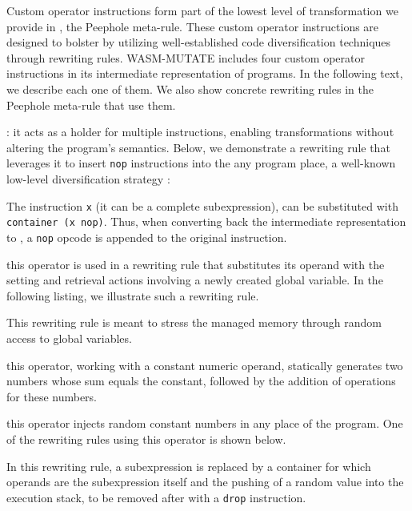 Custom operator instructions form part of the lowest level of transformation we provide in \tool, the Peephole meta-rule.
These custom operator instructions are designed to bolster \tool by utilizing well-established code diversification techniques through rewriting rules.
WASM-MUTATE includes four custom operator instructions in its intermediate representation of \wasm programs.
In the following text, we describe each one of them.
We also show concrete rewriting rules in the Peephole meta-rule that use them.

: it acts as a holder for multiple instructions, enabling transformations without altering the program's semantics. 
Below, we demonstrate a rewriting rule that leverages it to insert \texttt{nop} instructions into the any \Wasm program place, a well-known low-level diversification strategy \cite{nop}:



\noindent The instruction \texttt{x} (it can be a complete subexpression), can be substituted with \texttt{container (x nop)}. Thus, when converting back the intermediate representation to \wasm, a \texttt{nop} opcode is appended to the original instruction.


 this operator is used in a rewriting rule that substitutes its operand with the setting and retrieval actions involving a newly created global variable. In the following listing, we illustrate such a rewriting rule.



\noindent This rewriting rule is meant to stress the managed memory through random access to global variables.

 this operator, working with a constant numeric operand, statically generates two numbers whose sum equals the constant, followed by the addition of operations for these numbers.



 this operator injects random constant numbers in any place of the program. One of the rewriting rules using this operator is shown below.



\noindent In this rewriting rule, a subexpression is replaced by a container for which operands are the subexpression itself and the pushing of a random value into the execution stack, to be removed after with a \texttt{drop} instruction.

